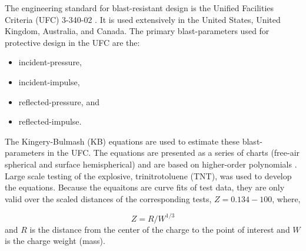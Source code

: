 The engineering standard for blast-resistant design is the Unified Facilities Criteria (UFC) 3-340-02 \cite{UFC3-340-02-2008}.  It is used extensively in the United States, United Kingdom, Australia, and Canada.   The primary blast-parameters used for protective design in the UFC are the:
\begin{itemize}
  \item incident-pressure,
  \item incident-impulse,
  \item reflected-pressure, and
  \item reflected-impulse.
\end{itemize}

The Kingery-Bulmash (KB) equations are used to estimate these blast-parameters in the UFC.  The equations are presented as a series of charts (free-air spherical and surface hemispherical) and are based on higher-order polynomials \cite{Kingery1984}.  Large scale testing of the explosive, trinitrotoluene (TNT), was used to develop the equations.  Because the equaitons are curve fits of test data, they are only valid over the scaled distances of the corresponding tests, $Z = 0.134 - 100$, where, 

$$Z=R/W^{1/3}$$
and $R$ is the distance from the center of the charge to the point of interest and $W$ is the charge weight (mass). 

